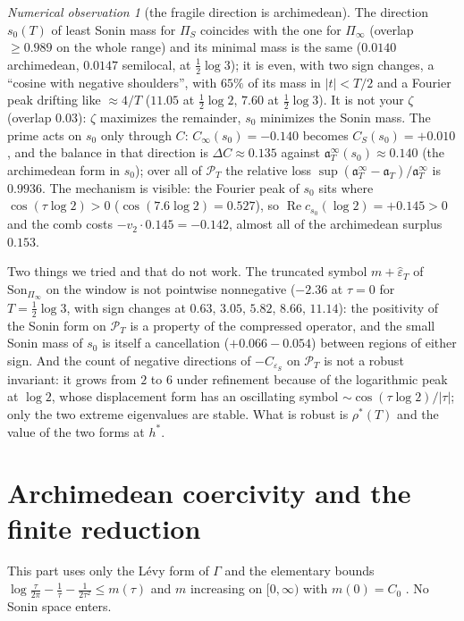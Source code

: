 \documentclass[11pt]{amsart}
\theoremstyle{definition}
\theoremstyle{remark}
\newtheorem{observation}[theorem]{Numerical observation}
\newcommand{\Rel}{\operatorname{Re}}
\newcommand{\PT}{\mathcal P_T}
\newcommand{\Son}{\mathrm{Son}}
\begin{document}
\begin{observation}[the fragile direction is archimedean]\label{obs:s0}
The direction $s_0(T)$ of least Sonin mass for $\Pi_S$ coincides with the one for $\Pi_\infty$ (overlap $\ge0.989$ on the whole
range) and its minimal mass is the same ($0.0140$ archimedean, $0.0147$ semilocal, at $\frac12\log3$); it is even, with two sign
changes, a ``cosine with negative shoulders'', with $65\%$ of its mass in $|t|<T/2$ and a Fourier peak drifting like
$\approx4/T$ ($11.05$ at $\frac12\log2$, $7.60$ at $\frac12\log3$). It is not your $\zeta$ (overlap $0.03$): $\zeta$ maximizes the
remainder, $s_0$ minimizes the Sonin mass. The prime acts on $s_0$ only through $C$: $C_\infty(s_0)=-0.140$ becomes
$C_S(s_0)=+0.010$, and the balance in that direction is $\Delta C\approx0.135$ against $\mathfrak a^\infty_T(s_0)\approx0.140$
(the archimedean form in $s_0$); over all of $\PT$ the relative loss $\sup(\mathfrak a^\infty_T-\mathfrak a_T)/\mathfrak a^\infty_T$ is
$0.9936$. The mechanism is visible: the Fourier peak of $s_0$ sits where $\cos(\tau\log2)>0$ ($\cos(7.6\log2)=0.527$), so
$\Rel c_{s_0}(\log2)=+0.145>0$ and the comb costs $-v_2\cdot0.145=-0.142$, almost all of the archimedean surplus $0.153$.
\end{observation}

Two things we tried and that do not work. The truncated symbol $m+\widehat\varepsilon_T$ of $\Son_{\Pi_\infty}$ on the window is
not pointwise nonnegative ($-2.36$ at $\tau=0$ for $T=\frac12\log3$, with sign changes at $0.63$, $3.05$, $5.82$, $8.66$,
$11.14$): the positivity of the Sonin form on $\PT$ is a property of the compressed operator, and the small Sonin mass of $s_0$
is itself a cancellation ($+0.066-0.054$) between regions of either sign. And the count of negative directions of $-C_{\varepsilon_S}$
on $\PT$ is not a robust invariant: it grows from $2$ to $6$ under refinement because of the logarithmic peak at $\log2$, whose
displacement form has an oscillating symbol $\sim\cos(\tau\log2)/|\tau|$; only the two extreme eigenvalues are stable. What is
robust is $\rho^*(T)$ and the value of the two forms at $h^*$.

\section{Archimedean coercivity and the finite reduction}\label{sec:coer}

This part uses only the L\'evy form of $\Gamma$ and the elementary bounds
$\log\frac\tau{2\pi}-\frac1\tau-\frac1{2\tau^2}\le m(\tau)$ and $m$ increasing on $[0,\infty)$ with $m(0)=C_0$
\cite[Lemma~mbounds]{Paper47}. No Sonin space enters.
\end{document}
